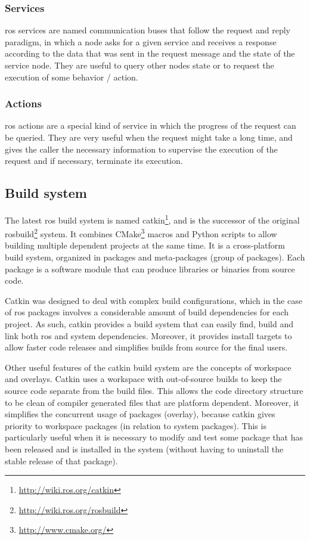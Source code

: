 \subsubsection{Services}

\gls{ros} services are named communication buses that follow the request and reply paradigm, in which a node asks for a given service and receives a response according to the data that was sent in the request message and the state of the service node. They are useful to query other nodes state or to request the execution of some behavior / action.


\subsubsection{Actions}

\gls{ros} actions are a special kind of service in which the progress of the request can be queried. They are very useful when the request might take a long time, and gives the caller the necessary information to supervise the execution of the request and if necessary, terminate its execution.


\subsection{Build system}

The latest \gls{ros} build system is named catkin\footnote{\url{http://wiki.ros.org/catkin}}, and is the successor of the original rosbuild\footnote{\url{http://wiki.ros.org/rosbuild}} system. It combines CMake\footnote{\url{http://www.cmake.org/}} macros and Python scripts to allow building multiple dependent projects at the same time. It is a cross-platform build system, organized in packages and meta-packages (group of packages). Each package is a software module that can produce libraries or binaries from source code.

Catkin was designed to deal with complex build configurations, which in the case of \gls{ros} packages involves a considerable amount of build dependencies for each project. As such, catkin provides a build system that can easily find, build and link both \gls{ros} and system dependencies. Moreover, it provides install targets to allow faster code releases and simplifies builds from source for the final users.

Other useful features of the catkin build system are the concepts of workspace and overlays. Catkin uses a workspace with out-of-source builds to keep the source code separate from the build files. This allows the code directory structure to be clean of compiler generated files that are platform dependent. Moreover, it simplifies the concurrent usage of packages (overlay), because catkin gives priority to workspace packages (in relation to system packages). This is particularly useful when it is necessary to modify and test some package that has been released and is installed in the system (without having to uninstall the stable release of that package).


